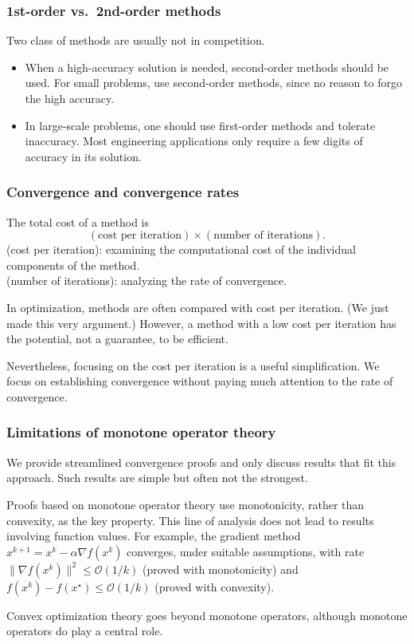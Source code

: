 \documentclass[10pt,mathserif]{beamer}
\begin{document}
\begin{frame}
\frametitle{1st-order vs.\ 2nd-order methods}
Two class of methods are usually not in competition.


\begin{itemize}
\item
When a high-accuracy solution is needed, second-order methods should be used.
For small problems, use second-order methods, since no reason to forgo the high accuracy.
\item 
In large-scale problems, one should use first-order methods and tolerate inaccuracy.
Most engineering applications only require a few digits of accuracy in its solution.
\end{itemize}


\end{frame}

\begin{frame}
\frametitle{Convergence and convergence rates}
The total cost of a method is
\[
(\text{cost per iteration})\times(\text{number of iterations}).
\]
(cost per iteration): examining the computational cost of the individual components of the method.\\
(number of iterations): analyzing the rate of convergence.


\vspace{0.2in}

In optimization, methods are often compared with cost per iteration.
(We just made this very argument.)
However, a method with a low cost per iteration has the potential, not a guarantee, to be efficient.


\vspace{0.2in}

Nevertheless, focusing on the cost per iteration is a useful simplification.
We focus on establishing convergence without paying much attention to the rate of convergence.
\end{frame}





\begin{frame}
\frametitle{Limitations of monotone operator theory}
We provide streamlined convergence proofs and only discuss results that fit this approach.
Such results are simple but often not the strongest.

\vspace{0.2in}

Proofs based on monotone operator theory use monotonicity, rather than convexity, as the key property.
This line of analysis does not lead to results involving function values.
For example, the gradient method $x^{k+1}=x^k-\alpha\nabla f(x^k)$ converges, under suitable assumptions, with rate $\|\nabla f(x^k)\|^2\le \mathcal{O}(1/k)$ 
(proved with monotonicity)
and $f(x^k)-f(x^\star)\le \mathcal{O}(1/k)$
(proved with convexity).

\vspace{0.2in}
Convex optimization theory goes beyond monotone operators, although monotone operators do play a central role.

\end{frame}
\end{document}
